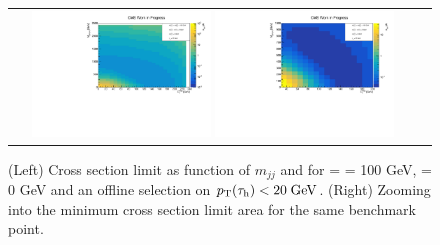 \begin{figure}[tbh!]
	\centering
	\begin{tabular}{cc}
		\includegraphics[width=0.45\textwidth]{analysis/pics/JetInvMass_vs_MET_xsec_chi100_lsp000_taupt20.pdf}
		\includegraphics[width=0.45\textwidth]{analysis/pics/JetInvMass_vs_MET_xsec_chi100_lsp000_taupt20_zoom.pdf} 		
	\end{tabular}
	\caption{(Left) Cross section limit as function of $m_{jj}$ and \met for \charginopm = \neutralinotwo = 100 GeV, \neutralinoone = 0 GeV and an offline selection on $p_{\text{T}}(\tau_{\text{h}}) <  20\;\text{Ge}\kern-0.06667em\text{V}$. (Right) Zooming into the minimum cross section limit area for the same benchmark point.}
	\label{fig::JetInvMass_vs_MET_xsec_chi100_lsp000_taupt20}
\end{figure}

